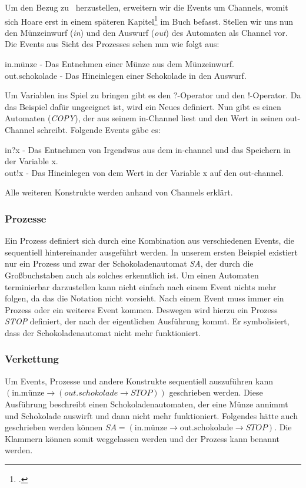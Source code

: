 Um den Bezug zu \CA\ herzustellen, erweitern wir die Events um Channels, womit sich Hoare erst in einem späteren Kapitel\footcite[Kap. 4.2]{CSPBOOK} im Buch befasst. Stellen wir uns nun den Münzeinwurf (\textit{in}) und den Auswurf (\textit{out}) des Automaten als Channel vor. Die Events aus Sicht des Prozesses sehen nun wie folgt aus:

\begin{addmargin}[1cm]{0cm}
in.münze - Das Entnehmen einer Münze aus dem Münzeinwurf.\\
out.schokolade - Das Hineinlegen einer Schokolade in den Auswurf.
\end{addmargin}

Um Variablen ins Spiel zu bringen gibt es den ?-Operator und den !-Operator. Da das Beispiel dafür ungeeignet ist, wird ein Neues definiert. Nun gibt es einen Automaten (\textit{COPY}), der aus seinem in-Channel liest und den Wert in seinen out-Channel schreibt. Folgende Events gäbe es:

\begin{addmargin}[1cm]{0cm}
in?x - Das Entnehmen von Irgendwas aus dem in-channel und das Speichern in der Variable x.\\
out!x - Das Hineinlegen von dem Wert in der Variable x auf den out-channel.
\end{addmargin}

Alle weiteren Konstrukte werden anhand von Channels erklärt.

\subsubsection{Prozesse}
Ein Prozess definiert sich durch eine Kombination aus verschiedenen Events, die sequentiell hintereinander ausgeführt werden. In unserem ersten Beispiel existiert nur ein Prozess und zwar der Schokoladenautomat \textit{SA}, der durch die Großbuchstaben auch als solches erkenntlich ist. Um einen Automaten terminierbar darzustellen kann nicht einfach nach einem Event nichts mehr folgen, da das die Notation nicht vorsieht. Nach einem Event muss immer ein Prozess oder ein weiteres Event kommen. Deswegen wird hierzu ein Prozess \textit{STOP} definiert, der nach der eigentlichen Ausführung kommt. Er symbolisiert, dass der Schokoladenautomat nicht mehr funktioniert.

\subsubsection{Verkettung}
Um Events, Prozesse und andere Konstrukte sequentiell auszuführen kann $ (\text{in.münze} \rightarrow (out.schokolade \rightarrow STOP)) $ geschrieben werden. Diese Ausführung beschreibt einen Schokoladenautomaten, der eine Münze annimmt und Schokolade auswirft und dann nicht mehr funktioniert. Folgendes hätte auch geschrieben werden können $ SA = (\text{in.münze} \rightarrow \text{out.schokolade} \rightarrow STOP) $. Die Klammern können somit weggelassen werden und der Prozess kann benannt werden.

